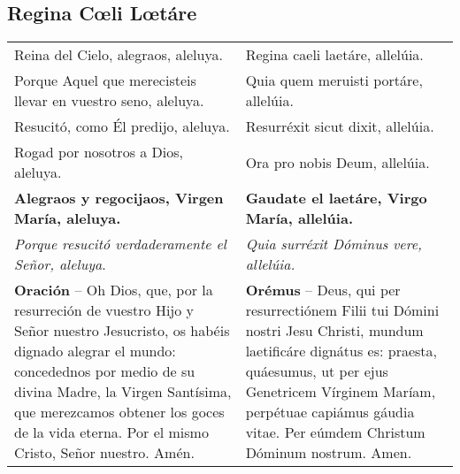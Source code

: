 \documentclass[./devocionario.tex]{subfiles}
\begin{document}
    \subsection*{Regina Cœli Lœtáre}
    \begin{tabular} { p{} p{} }

        Reina del Cielo, alegraos, aleluya. & Regina caeli laetáre, allelúia.\\
        Porque Aquel que merecisteis llevar en vuestro seno, aleluya. & 
        Quia quem meruisti portáre, allelúia.\\
        Resucitó, como Él predijo, aleluya. & Resurréxit sicut dixit, allelúia.\\
        Rogad por nosotros a Dios, aleluya. & Ora pro nobis Deum, allelúia.\\
        \textbf{Alegraos y regocijaos, Virgen María, aleluya.} & 
        \textbf{Gaudate el laetáre, Virgo María, allelúia.}\\
        \textit{Porque resucitó verdaderamente el Señor, aleluya}. & 
        \textit{Quia surréxit Dóminus vere, allelúia.}\\
        \textbf{Oración} -- Oh Dios, que, por la resurreción de vuestro Hijo y Señor nuestro Jesucristo, 
        os habéis dignado alegrar el mundo: concedednos por medio de su divina Madre, la Virgen Santísima, 
        que merezcamos obtener los goces de la vida eterna. Por el mismo Cristo, Señor nuestro. Amén. & 
        \textbf{Orémus} -- Deus, qui per resurrectiónem Filii tui Dómini nostri Jesu Christi, 
        mundum laetificáre dignátus es: praesta, quáesumus, ut per ejus Genetricem Vírginem Maríam, 
        perpétuae capiámus gáudia vitae. Per eúmdem Christum Dóminum nostrum. Amen.
    \end{tabular}
\end{document}
